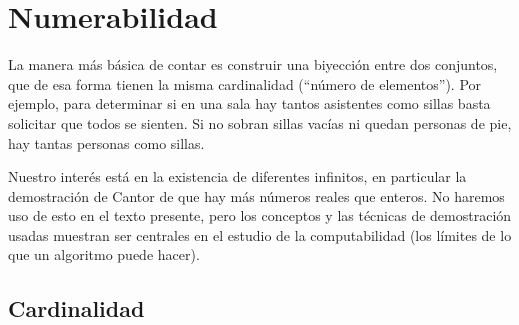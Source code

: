 %

\chapter{Numerabilidad}
\label{cha:numerabilidad}

  La manera más básica de contar es construir una biyección%
  entre dos conjuntos,
  que de esa forma tienen la misma cardinalidad
  (``número de elementos'').
  Por ejemplo,
  para determinar si en una sala hay tantos asistentes como sillas
  basta solicitar que todos se sienten.
  Si no sobran sillas vacías ni quedan personas de pie,
  hay tantas personas como sillas.

  Nuestro interés está en la existencia
  de diferentes infinitos,
  en particular la demostración de Cantor%
  de que hay más números reales que enteros.
  No haremos uso de esto en el texto presente,
  pero los conceptos y las técnicas de demostración usadas
  muestran ser centrales en el estudio de la computabilidad
  (los límites de lo que un algoritmo puede hacer).

\section{Cardinalidad}
\label{sec:cardinalidad}

